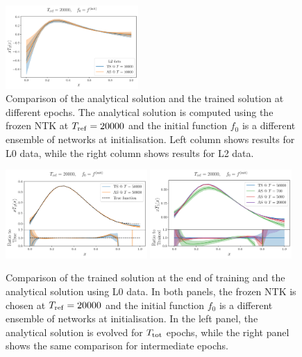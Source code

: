\begin{figure}[ht!]
    \hspace{10mm}
    \includegraphics[width=0.45\textwidth]{plots/analytical_solution/xT3/evolution/tr_vs_an/L2/linear/evolution_vs_trained_epoch_10000_L2_linear.pdf}
    \caption{Comparison of the analytical solution and the trained solution at
    different epochs. The analytical solution is computed using the frozen NTK
    at $T_{\rm ref} = 20000$ and the initial function $f_0$ is a different
    ensemble of networks at initialisation. Left column shows results for L0
    data, while the right column shows results for L2 data.}
    \label{fig:xT3_analytical_vs_trained}
  \end{figure}

\begin{figure}[ht!]
  \centering
  \includegraphics[width=0.48\textwidth]{plots/analytical_solution/xT3/evolution/from_f0/L0/linear/evolution_epoch_50000_L0_linear.pdf}
  \includegraphics[width=0.48\textwidth]{plots/analytical_solution/xT3/evolution/from_f0/L0/linear/evolution_epochs_700_5000_20000_L0_linear.pdf}
  \caption{Comparison of the trained solution at the end of training and the
  analytical solution using L0 data. In both panels, the frozen NTK is chosen at
  $T_{\rm ref} = 20000$ and the initial function $f_0$ is a different ensemble
  of networks at initialisation. In the left panel, the analytical solution is
  evolved for $T_{\rm tot}$ epochs, while the right panel shows the same
  comparison for intermediate epochs.}
  \label{fig:xT3_analytical_init_L0}
\end{figure}

